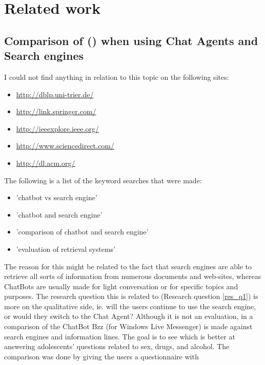 \chapter{Related work}
\label{chapter3:related_work}


\section{Comparison of  () when using Chat Agents and Search engines}
\label{chapter3:chatbot_vs_search_engine}
I could not find anything in relation to this topic on the following sites:
\begin{itemize}
	\item \url{http://dblp.uni-trier.de/}
	\item \url{http://link.springer.com/}
	\item \url{http://ieeexplore.ieee.org/}
	\item \url{http://www.sciencedirect.com/}
	\item \url{http://dl.acm.org/}
\end{itemize}
The following is a list of the keyword searches that were made:
\begin{itemize}
	\item 'chatbot vs search engine'
	\item 'chatbot and search engine'
	\item 'comparison of chatbot and search engine'
	\item 'evaluation of retrieval systems' 
\end{itemize}
The reason for this might be related to the fact that search engines are able to retrieve all sorts of information from numerous documents and web-sites, whereas 
ChatBots are usually made for light conversation or for specific topics and purposes. The research question this is related to (Research question \ref{res_q1}) 
is more on the qualitative side, ie. will the users continue to use the search engine, or would they switch to the Chat Agent?
\vspace{0.5em}\newline
Although it is not an evaluation, in \cite{Crutzen2011} a comparison of the ChatBot Bzz (for Windows Live Messenger) is made against search engines and information lines. 
The goal is to see which is better at answering adolescents' questions related to sex, drugs, and alcohol. The comparison was done by giving the users a questionnaire with 
